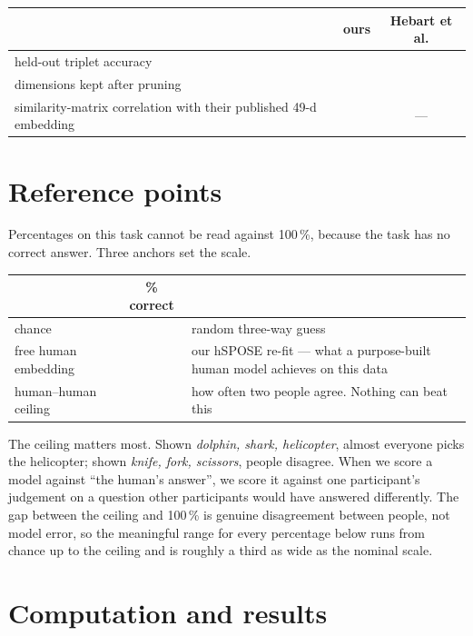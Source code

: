 \documentclass[11pt]{article}
\begin{document}
\begin{center}
\begin{tabular}{@{}L{7.4cm}cc@{}}
\toprule
 & \textbf{ours} & \textbf{Hebart et al.} \\
\midrule
held-out triplet accuracy & & \\
dimensions kept after pruning & & \\
similarity-matrix correlation with their published 49-d embedding & & --- \\
\bottomrule
\end{tabular}
\end{center}

\section{Reference points}

Percentages on this task cannot be read against 100\,\%, because the task has no correct answer.
Three anchors set the scale.

\begin{center}
\begin{tabular}{@{}lcL{7.6cm}@{}}
\toprule
 & \textbf{\% correct} & \\
\midrule
chance & & random three-way guess \\
free human embedding & & our hSPOSE re-fit --- what a purpose-built human model achieves on this
data \\
human--human ceiling & & how often two people agree. Nothing can beat this \\
\bottomrule
\end{tabular}
\end{center}

The ceiling matters most. Shown \emph{dolphin, shark, helicopter}, almost everyone picks the
helicopter; shown \emph{knife, fork, scissors}, people disagree. When we score a model against
``the human's answer'', we score it against one participant's judgement on a question other
participants would have answered differently. The gap between the ceiling and 100\,\% is genuine
disagreement between people, not model error, so the meaningful range for every percentage below
runs from chance up to the ceiling and is roughly a third as wide as the nominal scale.

\section{Computation and results}
\end{document}
